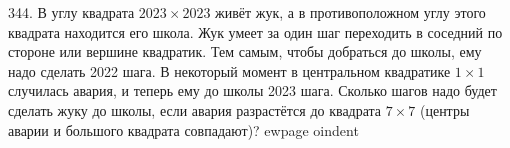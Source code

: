 344. В углу квадрата $2023\times2023$ живёт жук, а в противоположном углу этого квадрата находится его школа. Жук умеет за один шаг переходить в соседний по стороне или вершине квадратик. Тем самым, чтобы добраться до школы, ему надо сделать 2022 шага. В некоторый момент в центральном квадратике $1\times1$ случилась авария, и теперь ему до школы 2023 шага. Сколько шагов надо будет сделать жуку до школы, если авария разрастётся до квадрата $7\times7$ (центры аварии и большого квадрата совпадают)?
ewpage
oindent
